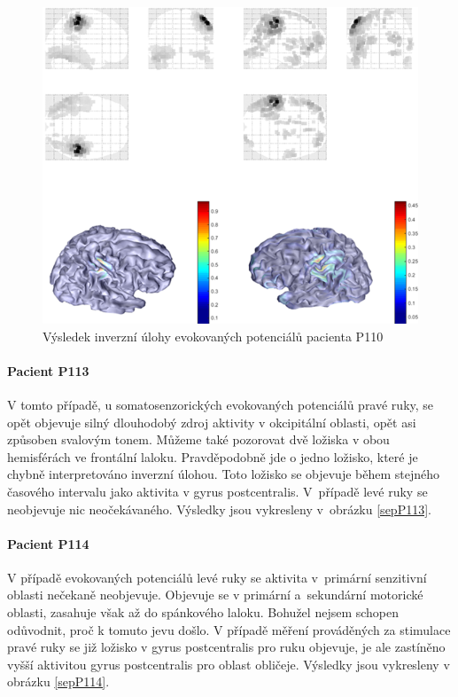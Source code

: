 \begin{figure}[!h]
\includegraphics[width=1.0\textwidth]{casti/aplikace/sep/P110.png}
\caption{Výsledek inverzní úlohy evokovaných potenciálů pacienta P110}
\end{figure}

\paragraph{Pacient P113}
V tomto případě, u somatosenzorických evokovaných potenciálů pravé ruky, se opět objevuje silný dlouhodobý zdroj aktivity v okcipitální oblasti, opět asi způsoben svalovým tonem. Můžeme také pozorovat dvě ložiska v obou hemisférách ve frontální laloku. Pravděpodobně jde o jedno ložisko, které je chybně interpretováno inverzní úlohou. Toto ložisko se objevuje během stejného časového intervalu jako aktivita v gyrus postcentralis.
V~případě levé ruky se neobjevuje nic neočekávaného.
Výsledky jsou vykresleny v~obrázku \ref{sepP113}.


\paragraph{Pacient P114}
V případě evokovaných potenciálů levé ruky se aktivita v~primární senzitivní oblasti nečekaně neobjevuje. Objevuje se v primární a~sekundární motorické oblasti, zasahuje však až do spánkového laloku. Bohužel nejsem schopen odůvodnit, proč k tomuto jevu došlo.
V případě měření prováděných za stimulace pravé ruky se již ložisko v gyrus postcentralis pro ruku objevuje, je ale zastíněno vyšší aktivitou gyrus postcentralis pro oblast obličeje.
Výsledky jsou vykresleny v obrázku \ref{sepP114}.

